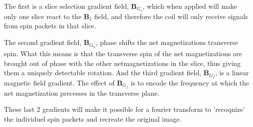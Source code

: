 The first is a slice selection gradient field, $\mathbf{B}_{G_s}$,
which when applied will make only one slice react to the
$\mathbf{B}_1$ field, and therefore the coil will only receive signals
from spin packets in that slice.

The second gradient field, $\mathbf{B}_{G_\phi}$, phase shifts the net
magnetizations transverse spin. What this means is that the transverse
spin of the net magnetizations are brought out of phase with the other
netmagnetizations in the slice, thus giving them a uniquely detectable
rotation. And the third gradient field, $\mathbf{B}_{G_f}$, is a
linear magnetic field gradient. The effect of $\mathbf{B}_{G_f}$ is to
encode the frequency at which the net magnetization precesses in the
transverse plane.

These last 2 gradients will make it possible for a fourier transform
to 'recoqnize' the individuel spin packets and recreate the original
image.

